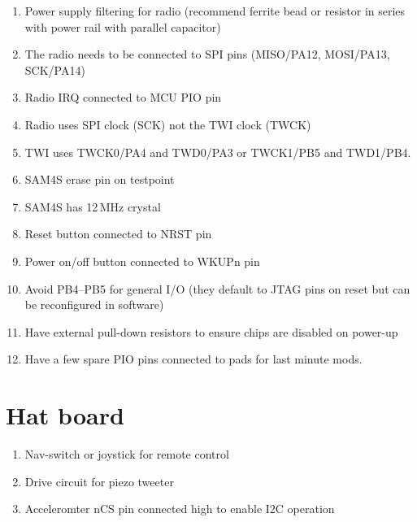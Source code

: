 \documentclass[a4paper, 12pt]{article}
\begin{document}
\begin{enumerate}
\item Power supply filtering for radio (recommend ferrite bead or
  resistor in series with power rail with parallel capacitor)

\item The radio needs to be connected to SPI pins (MISO/PA12,
  MOSI/PA13, SCK/PA14)

\item Radio IRQ connected to MCU PIO pin

\item Radio uses SPI clock (SCK) not the TWI clock (TWCK)

\item TWI uses TWCK0/PA4 and TWD0/PA3 or TWCK1/PB5 and TWD1/PB4.

\item SAM4S erase pin on testpoint

\item SAM4S has 12\,MHz crystal

\item Reset button connected to NRST pin

\item Power on/off button connected to WKUPn pin

\item Avoid PB4--PB5 for general I/O (they default to JTAG pins on
  reset but can be reconfigured in software)

\item Have external pull-down resistors to ensure chips are disabled on
  power-up

\item Have a few spare PIO pins connected to pads for last minute mods.

\end{enumerate}


\section{Hat board}

\begin{enumerate}

\item Nav-switch or joystick for remote control

\item Drive circuit for piezo tweeter



\item Acceleromter nCS pin connected high to enable I2C operation

\end{enumerate}
\end{document}
